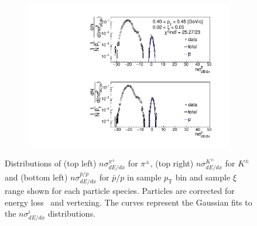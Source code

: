 \begin{figure}[h!]
\begin{subfigure}{.49\textwidth}
	\end{subfigure}\par
	\begin{subfigure}{.49\textwidth}
		\includegraphics[width=\linewidth, page=5]{chapters/chrgSTAR/img/dEdx/fit2019_thirdStep_2_0.pdf}
	\end{subfigure}
	\begin{minipage}{.49\textwidth}
		\caption{Distributions of (top left) $n\sigma^{\pi^\pm}_{dE/dx}$ for $\pi^\pm$, (top right) $n\sigma^{K^\pm}_{dE/dx}$ for $K^\pm$ and (bottom left) $n\sigma^{\bar{p}/p}_{dE/dx}$ for $\bar{p}/p$ in sample  $p_\textrm{T}$ bin and sample $\xi$ range  shown for each particle species. Particles are corrected for  energy loss~\cite{supplementaryNote} and vertexing. The curves represent the Gaussian fits to the $n\sigma^{i}_{dE/dx}$ distributions.}
		\label{fig:dEdx_fit_example}
	\end{minipage}
	
\end{figure}


